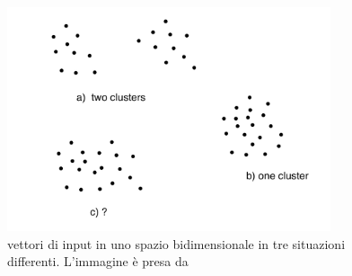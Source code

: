 \begin{figure}[h!]
	\centering
	\includegraphics[width=0.85\textwidth]{figs/Unsup_learning.png}
	\caption{vettori di input in uno spazio bidimensionale in tre situazioni differenti. L'immagine è presa da \cite{IntroML}}
	\label{Unsup}
\end{figure}

